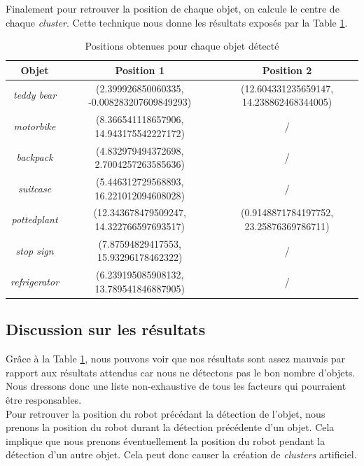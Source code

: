 \documentclass[10pt,a4paper]{article}
\begin{document}
   			Finalement pour retrouver la position de chaque objet, on calcule le centre de chaque \textit{cluster}. Cette technique nous donne les résultats exposés par la Table \ref{tab:res}.
   	
   		\begin{table}[h]
   			\begin{center}
   				\begin{tabular}{|c|c|c|}
   					\hline
   					Objet & Position 1 & Position 2\\
   					\hline
   					\textit{teddy bear} & (2.399926850060335, -0.008283207609849293)& (12.604331235659147, 14.238862468344005) \\
   					\hline
   					\textit{motorbike} & (8.366541118657906, 14.943175542227172) & / \\
   					\hline
   					\textit{backpack}& (4.832979494372698, 2.7004257263585636) & / \\
   					\hline
   					\textit{suitcase} & (5.446312729568893, 16.221012094608028) & / \\
   					\hline
   					\textit{pottedplant} & (12.343678479509247, 14.322766597693517) & (0.9148871784197752, 23.25876369786711) \\
   					\hline
   					\textit{stop sign} & (7.87594829417553, 15.93296178462322) & / \\
   					\hline
   					\textit{refrigerator} & (6.239195085908132, 13.789541846887905) & / \\
   					\hline
   				\end{tabular}
   			\end{center}
   			\caption{Positions obtenues pour chaque objet détecté}
   			\label{tab:res}
   		\end{table}
   	
   		\subsection{Discussion sur les résultats}
   		
   		Grâce à la Table \ref{tab:res}, nous pouvons voir que nos résultats sont assez mauvais par rapport aux résultats attendus car nous ne détectons pas le bon nombre d'objets. Nous dressons donc une liste non-exhaustive de tous les facteurs qui pourraient être responsables.\\
   		

		Pour retrouver la position du robot précédant la détection de l'objet, nous prenons la position du robot durant la détection précédente d'un objet. Cela implique que nous prenons éventuellement la position du robot pendant la détection d'un autre objet. Cela peut donc causer la création de \textit{clusters} artificiel.
		
\end{document}
